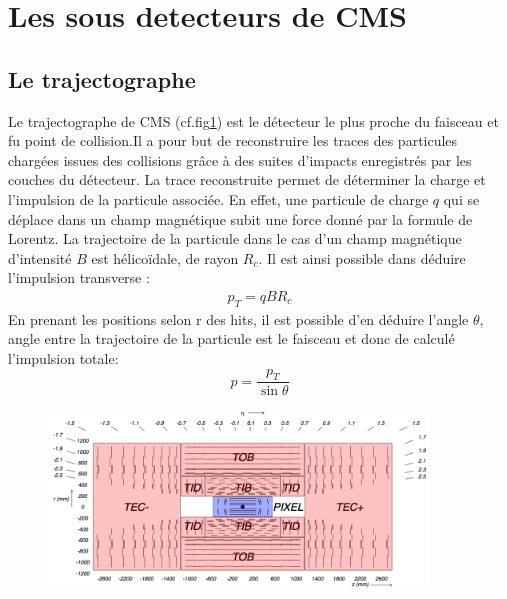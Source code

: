 \section{Les sous detecteurs de CMS}
\subsection{Le trajectographe}
Le trajectographe de CMS (cf.fig\ref{trajectographe}) est le détecteur le plus proche du faisceau et fu point de collision.Il a pour but de reconstruire les traces des particules chargées issues des collisions grâce à des suites d'impacts enregistrés par les couches du détecteur. La trace reconstruite permet de déterminer la charge et l'impulsion de la particule associée. En effet, une particule de charge $q$ qui se déplace dans un champ magnétique subit une force donné par la formule de Lorentz. La trajectoire de la particule dans le cas d'un champ magnétique d'intensité $B$ est hélicoïdale, de rayon $R_{c}$. Il est ainsi possible dans déduire l'impulsion transverse :
\begin{eqnarray}
p_{T}=qBR_{c}
\end{eqnarray}
En prenant les positions selon r des hits, il est possible d'en déduire l'angle $\theta$, angle entre la trajectoire de la particule est le faisceau et donc de calculé l'impulsion totale:
\begin{equation}
p=\frac{p_{T}}{\sin\theta}
\end{equation}
\begin{figure}[h!]
	\centering
	\includegraphics[width=0.9\textwidth]{CMS/tracker.png}
	\label{trajectographe}
\end{figure}

